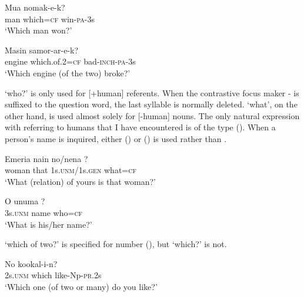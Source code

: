 \ea%
\label{ex:x525}
\gll Mua  nomak-e-k? \\
man which=\textsc{cf} win-\textsc{pa}-3s\\
\glt`Which man won?'
\z

\ea%
\label{ex:x526}
\gll Masin  samor-ar-e-k? \\
engine which.of.2=\textsc{cf} bad-\textsc{inch}-\textsc{pa}-3s\\
\glt`Which engine (of the two) broke?'
\z

 `who?' is only used for [+human] referents. When the contrastive focus maker - is suffixed to the question word, the last syllable is normally deleted.  `what', on the other hand, is used almost solely for [-human] nouns. The only natural expression with  referring to humans that I have encountered is of the type (). When a person's name is inquired, either  () or  () is used rather than .

\ea%
\label{ex:x649}
\gll Emeria nain no/nena ? \\
woman that 1s.\textsc{unm}/1s.\textsc{gen} what=\textsc{cf}\\
\glt`What (relation) of yours is that woman?'
\z

\ea%
\label{ex:x1855}
\gll O unuma ? \\
3s.\textsc{unm} name who=\textsc{cf}\\
\glt`What is his/her name?'
\z

 `which of two?' is specified for number (), but  `which?' is not.

\ea%
\label{ex:x691}
\gll No  kookal-i-n? \\
2s.\textsc{unm} which like-Np-\textsc{pr}.2s\\
\glt`Which one (of two or many) do you like?'
\z

